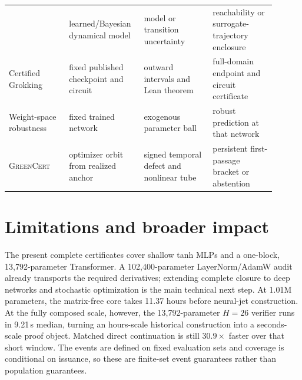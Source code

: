\documentclass{article}
\newcommand{\method}{\textsc{GreenCert}}
\begin{document}
\begin{table}[t]
\begin{tabular}{>{\raggedright\arraybackslash}p{0.21\linewidth}>{\raggedright\arraybackslash}p{0.23\linewidth}>{\raggedright\arraybackslash}p{0.24\linewidth}>{\raggedright\arraybackslash}p{0.22\linewidth}}
& learned/Bayesian dynamical model & model or transition uncertainty
& reachability or surrogate-trajectory enclosure \\
Certified Grokking \citep{naughton2026certified}
& fixed published checkpoint and circuit & outward intervals and Lean theorem
& full-domain endpoint and circuit certificate \\
Weight-space robustness \citep{weng2020weight}
& fixed trained network & exogenous parameter ball
& robust prediction at that network \\
\method{}
& optimizer orbit from realized anchor & signed temporal defect and nonlinear tube
& persistent first-passage bracket or abstention \\
\bottomrule
\end{tabular}
\end{table}
\else
\fi

\section{Limitations and broader impact}

The present complete certificates cover shallow tanh MLPs and a one-block,
13,792-parameter Transformer.  A 102,400-parameter LayerNorm/AdamW audit
already transports the required derivatives; extending complete closure to
deep networks and stochastic optimization is the main technical next step.
At 1.01M parameters, the matrix-free core takes 11.37 hours before neural-jet
construction.  At the fully composed scale, however, the 13,792-parameter
$H=26$ verifier runs in 9.21\,s median, turning an hours-scale historical
construction into a seconds-scale proof object.  Matched direct continuation
is still $30.9\times$ faster over that short window.  The events are defined on
fixed evaluation sets and coverage is conditional on issuance, so these are
finite-set event guarantees rather than population guarantees.
\end{document}
